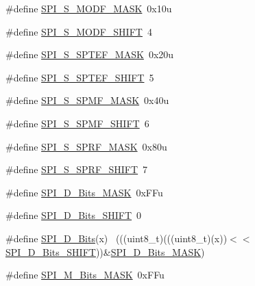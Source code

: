 \begin{DoxyCompactItemize}
\item 
\#define \hyperlink{group___s_p_i___register___masks_gae3b092b4e35b25cabf209f60637cb1f8}{S\+P\+I\+\_\+\+S\+\_\+\+M\+O\+D\+F\+\_\+\+M\+A\+SK}~0x10u
\item 
\#define \hyperlink{group___s_p_i___register___masks_ga1a037c05626e7bd1f84704dd98d620b9}{S\+P\+I\+\_\+\+S\+\_\+\+M\+O\+D\+F\+\_\+\+S\+H\+I\+FT}~4
\item 
\#define \hyperlink{group___s_p_i___register___masks_ga3f05ea8ee4b9eda3b55af33b0bbfe829}{S\+P\+I\+\_\+\+S\+\_\+\+S\+P\+T\+E\+F\+\_\+\+M\+A\+SK}~0x20u
\item 
\#define \hyperlink{group___s_p_i___register___masks_ga6c56a82dfa277e081682a45488b61b7f}{S\+P\+I\+\_\+\+S\+\_\+\+S\+P\+T\+E\+F\+\_\+\+S\+H\+I\+FT}~5
\item 
\#define \hyperlink{group___s_p_i___register___masks_gac6198d0ae23c413b2635a31550272d63}{S\+P\+I\+\_\+\+S\+\_\+\+S\+P\+M\+F\+\_\+\+M\+A\+SK}~0x40u
\item 
\#define \hyperlink{group___s_p_i___register___masks_ga8e59ca0da277d00018b2ee701bd19ec3}{S\+P\+I\+\_\+\+S\+\_\+\+S\+P\+M\+F\+\_\+\+S\+H\+I\+FT}~6
\item 
\#define \hyperlink{group___s_p_i___register___masks_ga1cada84cbeaeb0de6e2c496da39da693}{S\+P\+I\+\_\+\+S\+\_\+\+S\+P\+R\+F\+\_\+\+M\+A\+SK}~0x80u
\item 
\#define \hyperlink{group___s_p_i___register___masks_ga8f3cb2c492f263ccb54220066f1bb04d}{S\+P\+I\+\_\+\+S\+\_\+\+S\+P\+R\+F\+\_\+\+S\+H\+I\+FT}~7
\item 
\#define \hyperlink{group___s_p_i___register___masks_ga4be13a4d32a80a5054b5c7b555cacf96}{S\+P\+I\+\_\+\+D\+\_\+\+Bits\+\_\+\+M\+A\+SK}~0x\+F\+Fu
\item 
\#define \hyperlink{group___s_p_i___register___masks_ga7b4038420399880e8554f8078e0fc4a8}{S\+P\+I\+\_\+\+D\+\_\+\+Bits\+\_\+\+S\+H\+I\+FT}~0
\item 
\#define \hyperlink{group___s_p_i___register___masks_gabf32dda963f16f1f1ba52f8f29832898}{S\+P\+I\+\_\+\+D\+\_\+\+Bits}(x)                                                    ~(((uint8\+\_\+t)(((uint8\+\_\+t)(x))$<$$<$\hyperlink{group___s_p_i___register___masks_ga7b4038420399880e8554f8078e0fc4a8}{S\+P\+I\+\_\+\+D\+\_\+\+Bits\+\_\+\+S\+H\+I\+FT}))\&\hyperlink{group___s_p_i___register___masks_ga4be13a4d32a80a5054b5c7b555cacf96}{S\+P\+I\+\_\+\+D\+\_\+\+Bits\+\_\+\+M\+A\+SK})
\item 
\#define \hyperlink{group___s_p_i___register___masks_ga9767f876397867fe5481f0f2e8fe7426}{S\+P\+I\+\_\+\+M\+\_\+\+Bits\+\_\+\+M\+A\+SK}~0x\+F\+Fu
$$
\end{DoxyCompactItemize}
